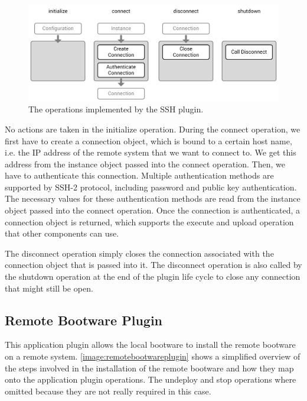 \begin{figure}[!htbp]
	\centering
	\includegraphics[resolution=600]{implementation/assets/ssh_plugin}
	\caption{The operations implemented by the SSH plugin.}
	\label{image:sshplugin}
\end{figure}

No actions are taken in the initialize operation.
During the connect operation, we first have to create a connection object, which is bound to a certain host name, i.e. the IP address of the remote system that we want to connect to.
We get this address from the instance object passed into the connect operation.
Then, we have to authenticate this connection.
Multiple authentication methods are supported by SSH-2 protocol, including password and public key authentication.
The necessary values for these authentication methods are read from the instance object passed into the connect operation.
Once the connection is authenticated, a connection object is returned, which supports the execute and upload operation that other components can use.

The disconnect operation simply closes the connection associated with the connection object that is passed into it.
The disconnect operation is also called by the shutdown operation at the end of the plugin life cycle to close any connection that might still be open.

\subsection{Remote Bootware Plugin}

This application plugin allows the local bootware to install the remote bootware on a remote system.
\autoref{image:remotebootwareplugin} shows a simplified overview of the steps involved in the installation of the remote bootware and how they map onto the application plugin operations.
The undeploy and stop operations where omitted because they are not really required in this case.

